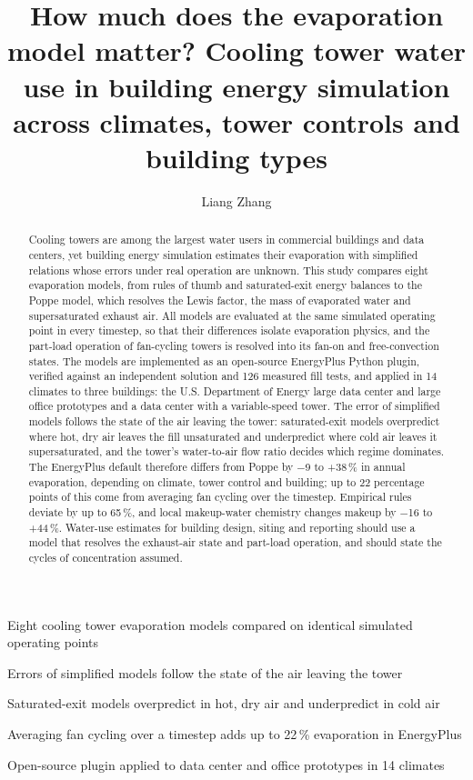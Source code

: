 \documentclass[preprint,12pt]{elsarticle}
\begin{document}
\begin{frontmatter}
\title{How much does the evaporation model matter? Cooling tower water use in building energy simulation across
climates, tower controls and building types}

\author[a,b]{Liang Zhang}

\begin{abstract}
Cooling towers are among the largest water users in commercial buildings and data centers, yet building energy
simulation estimates their evaporation with simplified relations whose errors under real operation are unknown. This
study compares eight evaporation models, from rules of thumb and saturated-exit energy balances to the Poppe model,
which resolves the Lewis factor, the mass of evaporated water and supersaturated exhaust air. All models are evaluated at
the same simulated operating point in every timestep, so that their differences isolate evaporation physics, and the
part-load operation of fan-cycling towers is resolved into its fan-on and free-convection states. The models are
implemented as an open-source EnergyPlus Python plugin, verified against an independent solution and 126 measured fill
tests, and applied in 14 climates to three buildings: the U.S. Department of Energy large data center and large office
prototypes and a data center with a variable-speed tower. The error of simplified models follows the state of the air
leaving the tower: saturated-exit models overpredict where hot, dry air leaves the fill unsaturated and underpredict
where cold air leaves it supersaturated, and the tower's water-to-air flow ratio decides which regime dominates. The
EnergyPlus default therefore differs from Poppe by $-$9 to +38\,\% in annual evaporation, depending on climate, tower
control and building; up to 22 percentage points of this come from averaging fan cycling over the timestep. Empirical
rules deviate by up to 65\,\%, and local makeup-water chemistry changes makeup by $-$16 to +44\,\%. Water-use estimates
for building design, siting and reporting should use a model that resolves the exhaust-air state and part-load
operation, and should state the cycles of concentration assumed.
\end{abstract}

\begin{highlights}
\item Eight cooling tower evaporation models compared on identical simulated operating points
\item Errors of simplified models follow the state of the air leaving the tower
\item Saturated-exit models overpredict in hot, dry air and underpredict in cold air
\item Averaging fan cycling over a timestep adds up to 22\,\% evaporation in EnergyPlus
\item Open-source plugin applied to data center and office prototypes in 14 climates
\end{highlights}


\end{frontmatter}
\end{document}
